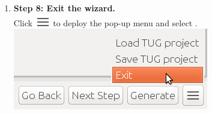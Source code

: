 \begin{enumerate}
%
\item {\bf Step 8: Exit the wizard.}\\
%
  Click \includegraphics[width=.05\textwidth]{images/menu_icon.png}
  to deploy the pop-up menu and select .\\

\vspace{1ex}
\includegraphics[width=.5\textwidth]{images/tug_exit.png}
\vspace{3ex}
\end{enumerate}
\newpage




